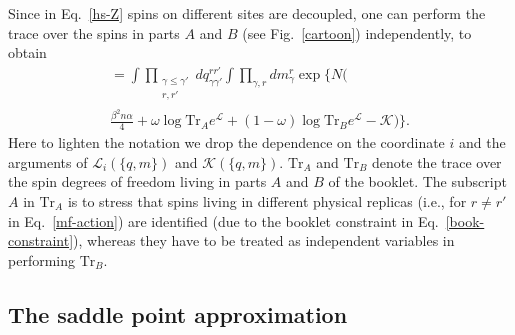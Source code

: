 \documentclass[twocolumn,superscriptaddress,prb,10pt]{revtex4-1}
\def\tr{\textrm{Tr}}
\begin{document}
Since in Eq.~\eqref{hs-Z} spins on  different sites are decoupled, one can 
perform the trace over the spins in parts $A$ and $B$ (see Fig.~\ref{cartoon}) 
independently, to obtain 
%
\begin{multline}
[Z^\alpha(\omega,n,\beta)]=
\int\prod_{\substack{\gamma\le\gamma'\\r,r'}}
dq^{rr'}_{\gamma\gamma'}
\int\prod_{\gamma,r}dm_\gamma^r
\exp\Big\{N\Big(\\
\frac{\beta^2n\alpha}{4}+\omega\log\tr_Ae^{{\mathcal L}}+
(1-\omega)\log\tr_Be^{{\mathcal L}}-{\mathcal K}\Big)\Big\}.
\label{z-final}
\end{multline}
%
Here to lighten the notation we drop the dependence on the coordinate $i$ 
and the arguments of ${\mathcal L}_i(\{q,m\})$ and ${\mathcal K}(\{q,m\})$. 
$\textrm{Tr}_{A}$ and $\textrm{Tr}_{B}$  denote the trace over the spin degrees 
of freedom living in parts $A$ and $B$ of the booklet.
The subscript $A$ in $\tr_A$ is to stress that spins living in different physical 
replicas (i.e., for $r\ne r'$ in Eq.~\eqref{mf-action}) are identified (due 
to the booklet constraint in Eq.~\eqref{book-constraint}), whereas they have 
to be treated as independent variables in performing $\tr_B$.  

\subsection{The saddle point approximation}
\label{saddle-point}
\end{document}
